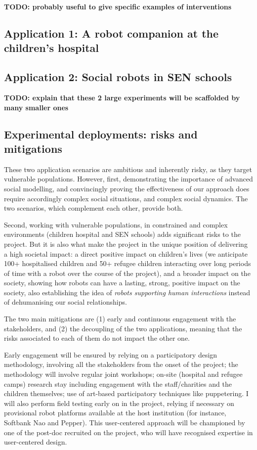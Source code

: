 \documentclass[11pt]{report}
\newcommand{\TODO}[1]{{\color{red}\textbf{TODO: #1}}}
\begin{document}
\TODO{probably useful to give specific examples of interventions}

\subsection{Application 1: A robot companion at the children's hospital}

\subsection{Application 2: Social robots in SEN schools}

\TODO{explain that these 2 large experiments will be scaffolded by many smaller
ones}

\subsection{Experimental deployments: risks and mitigations}

These two application scenarios are ambitious and inherently risky, as they
target vulnerable populations. However, first, demonstrating the
importance of advanced social modelling, and convincingly proving the
effectiveness of our approach does require accordingly complex social
situations, and complex social dynamics. The two scenarios, which complement
each other, provide both.

Second, working with vulnerable populations, in constrained and complex
environments (children hospital and SEN schools) adds significant risks to the
project. But it is also what make the project in the unique position of
delivering a high societal impact: a direct positive impact on children's
lives (we anticipate 100+ hospitalised children and 50+ refugee children
interacting over long periods of time with a robot over the course of the
project), and a broader impact on the society, showing how robots can have a
lasting, strong, positive impact on the society, also establishing the idea of
\emph{robots supporting human interactions} instead of dehumanising our social
relationships.

The two main mitigations are (1) early and continuous engagement with the
stakeholders, and (2) the decoupling of the two applications, meaning that the
risks associated to each of them do not impact the other one.

Early engagement will be ensured by relying on a participatory design
methodology, involving all the stakeholders from the onset of the project; the
methodology will involve regular joint workshops; on-site (hospital and refugee
camps) research stay including engagement with the staff/charities and the
children themselves; use of art-based participatory techniques like puppetering.
I will also perform field testing early on in the project, relying if necessary
on provisional robot platforms available at the host institution (for instance,
Softbank Nao and Pepper). This user-centered approach will be championed by one
of the post-doc recruited on the project, who will have recognised expertise in
user-centered design.
\end{document}
